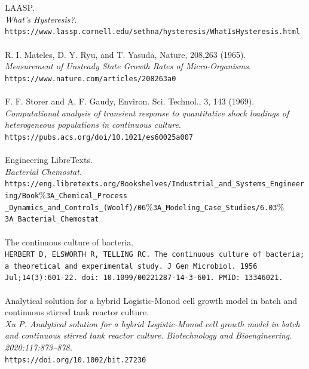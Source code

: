 \documentclass{article}
\begin{document}
\begin{thebibliography}{9}
\\\\
LAASP. 
\\
\textit{What's Hysteresis?}. 
\\\texttt{https://www.lassp.cornell.edu/sethna/hysteresis/WhatIsHysteresis.html}
\\\\
R. I. Mateles, D. Y. Ryu, and T. Yasuda, Nature, 208,263 (1965). 
\\
\textit{Measurement of Unsteady State Growth Rates of Micro-Organisms}. 
\\\texttt{https://www.nature.com/articles/208263a0}
\\\\
F. F. Storer and A. F. Gaudy, Environ. Sci. Technol., 3, 143 (1969). 
\\
\textit{Computational analysis of transient response to quantitative shock loadings of heterogeneous populations in continuous culture}. 
\\\texttt{https://pubs.acs.org/doi/10.1021/es60025a007}
\\\\
Engineering LibreTexts. 
\\
\textit{Bacterial Chemostat}. 
\\\texttt{https://eng.libretexts.org/Bookshelves/Industrial\_and\_Systems\_Engineering/Book$\%$3A\_Chemical\_Process
\\\_Dynamics\_and\_Controls\_(Woolf)/06$\%$3A\_Modeling\_Case\_Studies/6.03$\%$3A\_Bacterial\_Chemostat}
\\\\
The continuous culture of bacteria.
\\\texttt{HERBERT D, ELSWORTH R, TELLING RC. The continuous culture of bacteria; a theoretical and experimental study. J Gen Microbiol. 1956 Jul;14(3):601-22. doi: 10.1099/00221287-14-3-601. PMID: 13346021.}
\\\\
Analytical solution for a hybrid Logistic-Monod cell growth model in batch and continuous stirred tank reactor culture.
\\
\textit{Xu P. Analytical solution for a hybrid Logistic‐Monod cell growth model in batch and continuous stirred tank reactor culture. Biotechnology and Bioengineering. 2020;117:873–878.}
\\\texttt{https://doi.org/10.1002/bit.27230}
\\\\

\end{thebibliography}
\end{document}
